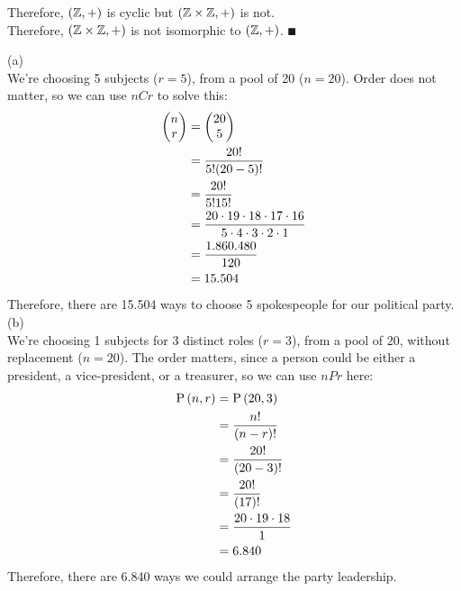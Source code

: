\documentclass[a4paper, 11pt]{report}
\begin{document}
Therefore, $(\mathbb{Z},+)$ is cyclic but $(\mathbb{Z}\times\mathbb{Z},+)$ is not.\\
Therefore, $(\mathbb{Z}\times\mathbb{Z},+)$ is not isomorphic to $(\mathbb{Z},+)$. $\QED$

\newpage
{}
\sol (a) \\
We're choosing 5 subjects ($r=5$), from a pool of 20 ($n=20$). Order does not matter, so we can use $nCr$ to solve this:
\begin{align*}
  \begin{pmatrix} n \\ r \end{pmatrix} &= \begin{pmatrix} 20 \\ 5 \end{pmatrix} \\
    &= \frac{20!}{5!(20-5)!} \\
    &= \frac{20!}{5!15!} \\
    &= \frac{20\cdot19\cdot18\cdot17\cdot16}{5\cdot4\cdot3\cdot2\cdot1} \\
    &= \frac{1.860.480}{120} \\
    &= 15.504
\end{align*}
Therefore, there are 15.504 ways to choose 5 spokespeople for our political party. \\

\sol (b) \\
We're choosing 1 subjects for 3 distinct roles ($r=3$), from a pool of 20, without replacement ($n=20$). The order matters, since a person could be either a president, a vice-president, or a treasurer, so we can use $nPr$ here:
\begin{align*}
  \mathrm{P}\left( n, r \right) &= \mathrm{P}\left( 20, 3 \right) \\
    &= \frac{n!}{(n-r)!} \\
    &= \frac{20!}{(20-3)!} \\
    &= \frac{20!}{(17)!} \\
    &= \frac{20\cdot19\cdot18}{1} \\
    &= 6.840 
\end{align*}
Therefore, there are 6.840 ways we could arrange the party leadership.
\end{document}
